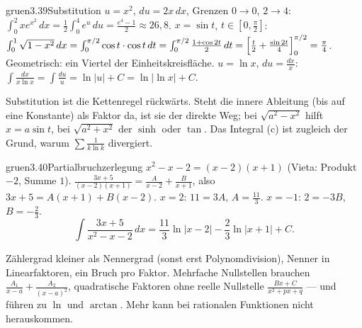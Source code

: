 \begin{loesungkarte}{gruen}{3.39}{Substitution}
$u = x^{2}$, $du = 2x\,dx$, Grenzen $0\to0$, $2\to4$: $\int_0^2xe^{x^{2}}\,dx = \frac12\int_0^4e^{u}\,du = \frac{e^{4} - 1}2\approx26{,}8$.
$x = \sin t$, $t\in[0, \frac\pi2]$: $\int_0^1\sqrt{1 - x^{2}}\,dx = \int_0^{\pi/2}\cos t\cdot\cos t\,dt = \int_0^{\pi/2}\frac{1 + \cos2t}2\,dt = \Bigl[\frac t2 + \frac{\sin2t}4\Bigr]_0^{\pi/2} = \frac\pi4$. Geometrisch: ein Viertel der Einheitskreisfläche.
$u = \ln x$, $du = \frac{dx}x$: $\int\frac{dx}{x\ln x} = \int\frac{du}u = \ln|u| + C = \ln|\ln x| + C$.
\begin{mitnehmen}\kastentext
Substitution ist die Kettenregel rückwärts. Steht die innere Ableitung (bis auf eine Konstante) als Faktor da, ist sie der direkte Weg; bei $\sqrt{a^{2} - x^{2}}$ hilft $x = a\sin t$, bei $\sqrt{a^{2} + x^{2}}$ der $\sinh$ oder $\tan$. Das Integral (c) ist zugleich der Grund, warum $\sum\frac1{k\ln k}$ divergiert.
\end{mitnehmen}
\end{loesungkarte}

\begin{loesungkarte}{gruen}{3.40}{Partialbruchzerlegung}
$x^{2} - x - 2 = (x - 2)(x + 1)$ (Vieta: Produkt $-2$, Summe $1$).
$\frac{3x + 5}{(x - 2)(x + 1)} = \frac A{x - 2} + \frac B{x + 1}$, also $3x + 5 = A(x + 1) + B(x - 2)$. $x = 2$: $11 = 3A$, $A = \frac{11}3$. $x = -1$: $2 = -3B$, $B = -\frac23$.
\[ \int\frac{3x + 5}{x^{2} - x - 2}\,dx = \frac{11}3\ln|x - 2| - \frac23\ln|x + 1| + C. \]
\begin{mitnehmen}\kastentext
Zählergrad kleiner als Nennergrad (sonst erst Polynomdivision), Nenner in Linearfaktoren, ein Bruch pro Faktor. Mehrfache Nullstellen brauchen $\frac{A_1}{x - a} + \frac{A_2}{(x - a)^{2}}$, quadratische Faktoren ohne reelle Nullstelle $\frac{Bx + C}{x^{2} + px + q}$ --- und führen zu $\ln$ und $\arctan$. Mehr kann bei rationalen Funktionen nicht herauskommen.
\end{mitnehmen}
\end{loesungkarte}

